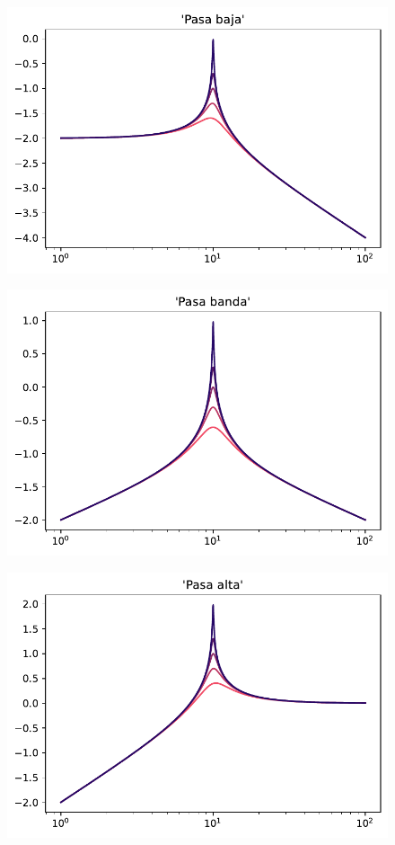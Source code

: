 \documentclass[12pt,a4paper]{article}
\numberwithin{equation}{section}
\numberwithin{figure}{section}
\begin{document}
\begin{figure}[h!] \centering
\includegraphics[scale=1.2]{Bode_1.pdf}
\end{figure}

\begin{figure}[h!] \centering
\includegraphics[scale=1.2]{Bode_2.pdf}
\end{figure}

\begin{figure}[h!] \centering
\includegraphics[scale=1.2]{Bode_3.pdf}
\end{figure}
\end{document}
